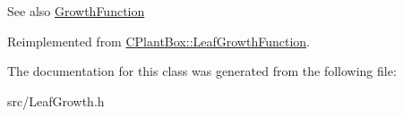 \begin{DoxySeeAlso}{See also}
\hyperlink{classCPlantBox_1_1GrowthFunction}{Growth\+Function} 
\end{DoxySeeAlso}


Reimplemented from \hyperlink{classCPlantBox_1_1LeafGrowthFunction_a6261339dd2731a2cf33dc1fa111c9eaa}{C\+Plant\+Box\+::\+Leaf\+Growth\+Function}.



The documentation for this class was generated from the following file\+:\begin{DoxyCompactItemize}
\item 
src/Leaf\+Growth.\+h\end{DoxyCompactItemize}
